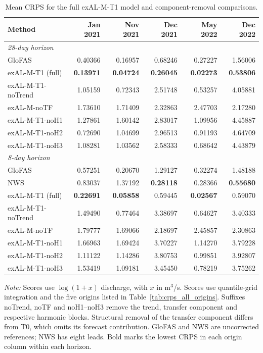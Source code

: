 \begin{table}[!htbp]
\centering
\begin{threeparttable}
\caption{Mean CRPS for the full exAL-M-T1 model and component-removal comparisons.}
\label{tab:component_comparison}
\setlength{\tabcolsep}{4pt}
\begin{tabular}{lrrrrr}
\hline
Method & Jan 2021 & Nov 2021 & Dec 2021 & May 2022 & Dec 2022 \\
\hline
\multicolumn{6}{l}{\textit{28-day horizon}} \\
GloFAS & 0.40366 & 0.16957 & 0.68246 & 0.27227 & 1.56006 \\
exAL-M-T1 (full) & \textbf{0.13971} & \textbf{0.04724} & \textbf{0.26045} & \textbf{0.02273} & \textbf{0.53806} \\
exAL-M-T1-noTrend & 1.05159 & 0.72343 & 2.51748 & 0.53257 & 4.05881 \\
exAL-M-noTF & 1.73610 & 1.71409 & 2.32863 & 2.47703 & 2.17280 \\
exAL-M-T1-noH1 & 1.27861 & 1.60142 & 2.83017 & 1.09956 & 4.45887 \\
exAL-M-T1-noH2 & 0.72690 & 1.04699 & 2.96513 & 0.91193 & 4.64709 \\
exAL-M-T1-noH3 & 1.08281 & 1.03562 & 2.58333 & 0.68642 & 4.43879 \\
\hline
\multicolumn{6}{l}{\textit{8-day horizon}} \\
GloFAS & 0.57251 & 0.20670 & 1.29127 & 0.32274 & 1.48188 \\
NWS & 0.83037 & 1.37192 & \textbf{0.28118} & 0.28366 & \textbf{0.55680} \\
exAL-M-T1 (full) & \textbf{0.22691} & \textbf{0.05858} & 0.59445 & \textbf{0.02567} & 0.59070 \\
exAL-M-T1-noTrend & 1.49490 & 0.77464 & 3.38697 & 0.64627 & 3.40333 \\
exAL-M-noTF & 1.79777 & 1.69066 & 2.18697 & 2.45857 & 2.30863 \\
exAL-M-T1-noH1 & 1.66963 & 1.69424 & 3.70227 & 1.14270 & 3.79228 \\
exAL-M-T1-noH2 & 1.11122 & 1.14286 & 3.80753 & 0.99851 & 3.92807 \\
exAL-M-T1-noH3 & 1.53419 & 1.09181 & 3.45450 & 0.78219 & 3.75262 \\
\hline
\end{tabular}
\begin{tablenotes}\footnotesize
\item \textit{Note:} Scores use $\log(1+x)$ discharge, with $x$ in m$^3$/s. Scores use quantile-grid integration and the five origins listed in Table~\ref{tab:crps_all_origins}. Suffixes noTrend, noTF and noH1--noH3 remove the trend, transfer component and respective harmonic blocks. Structural removal of the transfer component differs from T0, which omits its forecast contribution. GloFAS and NWS are uncorrected references; NWS has eight leads. Bold marks the lowest CRPS in each origin column within each horizon.
\end{tablenotes}
\end{threeparttable}
\end{table}
